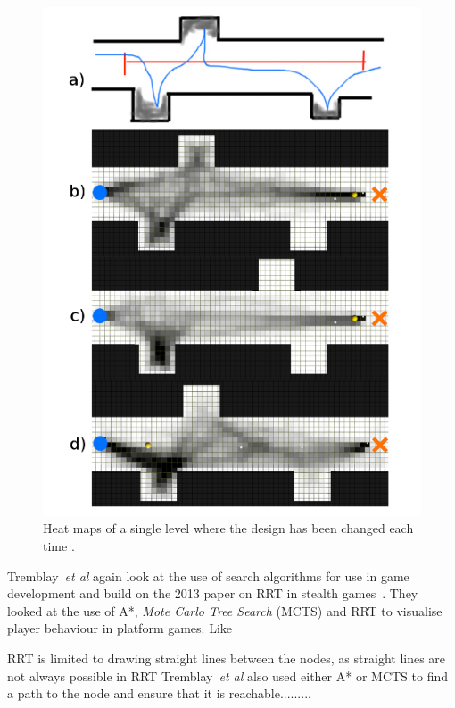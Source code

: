 \documentclass[journal]{IEEEtran}
\begin{document}
\begin{figure}[h]
	\includegraphics[width=1.0\linewidth]{TremblayHeatMap.png}
	\caption{ Heat maps of a single level where the design has been changed each time \cite{Tremblay2013}.}
	\label{TremblayHeatMap}
\end{figure} 




 Tremblay~\textit{et al} again look at the use of search algorithms for use in game development and build on the 2013 paper on RRT in stealth games~\cite{Tremblay2014}. They looked at the use of A*, \textit{Mote Carlo Tree Search} (MCTS) and RRT to visualise player behaviour in platform games. Like 

RRT is limited to drawing straight lines between the nodes, as straight lines are not always possible in RRT  Tremblay~\textit{et al} also used either A* or MCTS to find a path to the node and ensure that it is reachable.........
\end{document}
